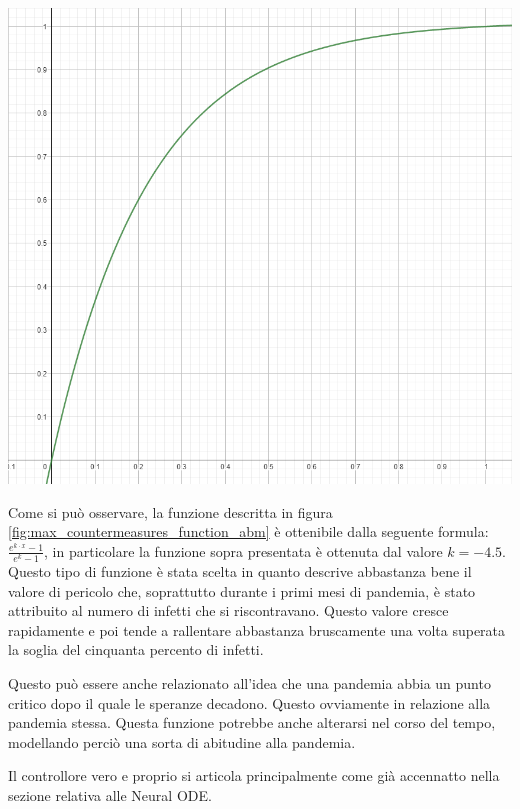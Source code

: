 \begin{minipage}{\linewidth}
	\centering
	\includegraphics[width=\textwidth]{img/activationfunction_controller.png}
	\label{fig:max_countermeasures_function_abm}
\end{minipage}

Come si può osservare, la funzione descritta in figura \ref{fig:max_countermeasures_function_abm} 
è ottenibile dalla seguente formula: $\frac{e^{k \cdot x}-1}{e^{k}-1}$, in particolare la funzione sopra 
presentata è ottenuta dal valore $k = -4.5$. Questo tipo di funzione è stata scelta in quanto descrive abbastanza 
bene il valore di pericolo che, soprattutto durante i primi mesi di pandemia, è stato attribuito al numero di infetti che 
si riscontravano. Questo valore cresce rapidamente e poi tende a rallentare abbastanza bruscamente una volta superata la 
soglia del cinquanta percento di infetti. 

Questo può essere anche relazionato all'idea che una pandemia abbia un punto critico dopo il quale le speranze decadono. Questo 
ovviamente in relazione alla pandemia stessa. Questa funzione potrebbe anche alterarsi nel corso del tempo, modellando perciò 
una sorta di abitudine alla pandemia. 

Il controllore vero e proprio si articola principalmente come già accennatto nella sezione relativa alle Neural ODE. 

